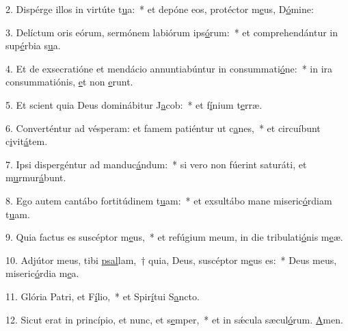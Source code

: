 2. Dispérge illos in virtúte t\uline{u}a:~* et depóne eos, protéctor m\uline{e}us, D\uline{ó}mine:\par 
3. Delíctum oris eórum, sermónem labiórum ips\uline{ó}rum:~* et comprehendántur in sup\uline{é}rbia s\uline{u}a.\par 
4. Et de exsecratióne et mendácio annuntiabúntur in consummati\uline{ó}ne:~* in ira consummatiónis, \uline{e}t non \uline{e}runt.\par 
5. Et scient quia Deus dominábitur J\uline{a}cob:~* et f\uline{í}nium t\uline{e}rræ.\par 
6. Converténtur ad vésperam: et famem patiéntur ut c\uline{a}nes,~* et circuíbunt c\uline{i}vit\uline{á}tem.\par 
7. Ipsi dispergéntur ad manduc\uline{á}ndum:~* si vero non fúerint saturáti, et m\uline{u}rmur\uline{á}bunt.\par 
8. Ego autem cantábo fortitúdinem t\uline{u}am:~* et exsultábo mane miseric\uline{ó}rdiam t\uline{u}am.\par 
9. Quia factus es suscéptor m\uline{e}us,~* et refúgium meum, in die tribulati\uline{ó}nis m\uline{e}æ.\par 
10. Adjútor meus, tibi \uline{psal}lam,~† quia, Deus, suscéptor m\uline{e}us es:~* Deus meus, miseric\uline{ó}rdia m\uline{e}a.\par 
11. Glória Patri, et F\uline{í}lio,~* et Spir\uline{í}tui S\uline{a}ncto.\par 
12. Sicut erat in princípio, et nunc, et s\uline{e}mper,~* et in sǽcula sæcul\uline{ó}rum. \uline{A}men.\par 
